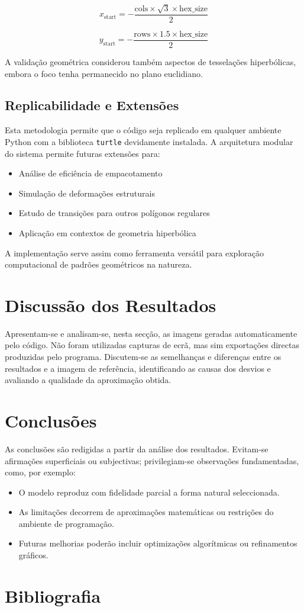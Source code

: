 \documentclass[12pt,a4paper,oneside]{extarticle}
\begin{document}
\begin{equation}
x_{\text{start}} = -\frac{\text{cols} \times \sqrt{3} \times \text{hex\_size}}{2}
\end{equation}

\begin{equation}
y_{\text{start}} = -\frac{\text{rows} \times 1.5 \times \text{hex\_size}}{2}
\end{equation}

A validação geométrica considerou também aspectos de tesselações hiperbólicas, embora o foco tenha permanecido no plano euclidiano.

\subsection{Replicabilidade e Extensões}

Esta metodologia permite que o código seja replicado em qualquer ambiente Python com a biblioteca \texttt{turtle} devidamente instalada. A arquitetura modular do sistema permite futuras extensões para:
\begin{itemize}
    \item Análise de eficiência de empacotamento
    \item Simulação de deformações estruturais
    \item Estudo de transições para outros polígonos regulares
    \item Aplicação em contextos de geometria hiperbólica
\end{itemize}

A implementação serve assim como ferramenta versátil para exploração computacional de padrões geométricos na natureza.

\section{Discussão dos Resultados}
Apresentam-se e analisam-se, nesta secção, as imagens geradas automaticamente pelo código.  
Não foram utilizadas capturas de ecrã, mas sim exportações directas produzidas pelo programa.  
Discutem-se as semelhanças e diferenças entre os resultados e a imagem de referência, identificando as causas dos desvios e avaliando a qualidade da aproximação obtida.

\section{Conclusões}
As conclusões são redigidas a partir da análise dos resultados.  
Evitam-se afirmações superficiais ou subjectivas; privilegiam-se observações fundamentadas, como, por exemplo:  
\begin{itemize}
    \item O modelo reproduz com fidelidade parcial a forma natural seleccionada.
    \item As limitações decorrem de aproximações matemáticas ou restrições do ambiente de programação.
    \item Futuras melhorias poderão incluir optimizações algorítmicas ou refinamentos gráficos.
\end{itemize}

\section{Bibliografia}
\printbibliography

\label{fim}
\end{document}
